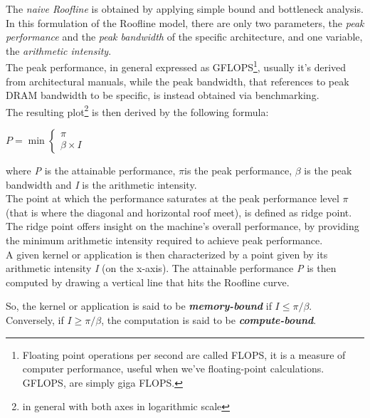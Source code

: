 	
	The \textit{naive Roofline} is obtained by applying simple bound and bottleneck analysis.
	In this formulation of the Roofline model, there are only two parameters, the \textit{peak performance} and the \textit{peak bandwidth} of the specific architecture, and one variable, the \textit{arithmetic intensity}.\\
	The peak performance, in general expressed as GFLOPS\footnote{Floating point operations per second are called FLOPS, it is a measure of computer performance, useful when we've floating-point calculations. GFLOPS, are simply giga FLOPS.}, usually it's derived from architectural manuals, while the peak bandwidth, that references to peak DRAM bandwidth to be specific, is instead obtained via benchmarking.\\
	The resulting plot\footnote{in general with both axes in logarithmic scale} is then derived by the following formula:
	\begin{center}
		\(P=\min {\begin{cases}\pi \\\beta \times I\end{cases}}\)
	\end{center}	
	where \textit{P} is the attainable performance, \(\pi\)is the peak performance, \(\beta\) is the peak bandwidth and \textit{I} is the arithmetic intensity.\\
	The point at which the performance saturates at the peak performance level \(\pi\) (that is where the diagonal and horizontal roof meet), is defined as ridge point.\\
	The ridge point offers insight on the machine's overall performance, by providing the minimum arithmetic intensity required to achieve peak performance.\\
	
	A given kernel or application is then characterized by a point given by its arithmetic intensity \textit{I} (on the x-axis). The attainable performance \textit{P} is then computed by drawing a vertical line that hits the Roofline curve.
	
	So, the kernel or application is said to be \textit{\textbf{memory-bound}} if \(I \leq \pi /\beta \).\\
	Conversely, if \( I\geq \pi /\beta \), the computation is said to be \textit{\textbf{compute-bound}}\cite{rooflinepaper, applyroofline}.

